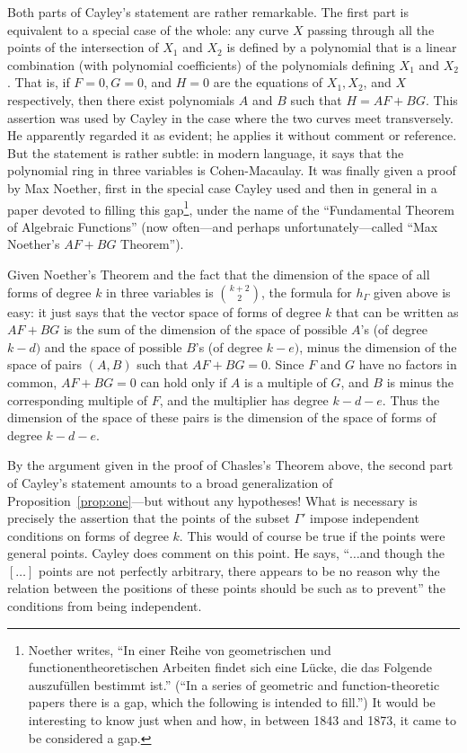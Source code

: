 \documentclass{bull-l}
\theoremstyle{pplain}
\theoremstyle{definition}
\begin{document}
Both parts of Cayley's statement are rather remarkable.  The first part is
equivalent to a special case of the whole: any curve $X$ passing through all
the points of the intersection of $X_1$ and $X_2$ is defined by a polynomial
that is a linear combination (with polynomial coefficients) of the polynomials
defining $X_1$ and $X_2$.  That is, if $F=0,G=0$, and $H=0$ are the equations
of $X_1,X_2$, and $X$ respectively, then there exist polynomials $A$ and $B$
such that $H=AF+BG$.  This assertion was used by Cayley in the case where the
two curves meet transversely.  He apparently regarded it as evident; he applies
it without comment or reference.  But the statement is rather subtle: in modern
language, it says that the polynomial ring in three variables is
Cohen-Macaulay.  It was finally given a proof by Max Noether, first in the
special case Cayley used \cite[p.\ 314]{Ca} and then in general \cite{No} in a
paper devoted to filling this gap\footnote{Noether writes, ``In einer Reihe von
geometrischen und functionentheoretischen Arbeiten findet sich eine L\"ucke, die
das Folgende auszuf\"ullen bestimmt ist.''  (``In a series of geometric and 
function-theoretic papers there is a gap, which the following is intended to
fill.'')  It would be interesting to know just when and how, in between 1843 and
1873, it came to be considered a gap.}, under the name of the ``Fundamental
Theorem of Algebraic Functions'' (now often---and perhaps
unfortunately---called ``Max Noether's $AF+BG$ Theorem'').

Given Noether's Theorem and the fact that the dimension of the space of all
forms of degree $k$ in three variables is $\binom{k+2}{2}$, the formula for $h_
\Gamma$ given above is easy: it just says that the vector space of forms of
degree $k$ that can be written as $AF+BG$ is the sum of the dimension of the
space of possible $A$'s (of degree $k-d)$ and the space of possible $B$'s (of
degree $k-e)$, minus the dimension of the space of pairs $(A,B)$ such that
$AF+BG=0$.  Since $F$ and $G$ have no factors in common, $AF+BG=0$ can hold
only if $A$ is a multiple of $G$, and $B$ is minus the corresponding multiple
of $F$, and the multiplier has degree $k-d-e$.   Thus the dimension of the
space of these pairs is the dimension of the space of forms of degree $k-d-e$.

By the argument given in the proof of Chasles's Theorem above, the second part
of Cayley's statement amounts to a broad generalization of 
Proposition~\ref{prop:one}---but without any hypotheses!  What is necessary is
precisely the assertion that the points of the subset $\Gamma'$ impose
independent conditions on forms of degree $k$.  This would of course be true if
the points were general points.  Cayley does comment on this point.  He says, 
``$\dots$and though the $[\dots]$ points are not perfectly arbitrary, 
there appears
to be no reason why the relation between the positions of these points should
be such as to prevent'' the conditions from being independent.
\end{document}
